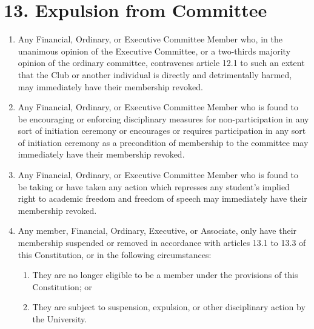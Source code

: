 \documentclass[12pt]{article}
\begin{document}
\section{13. Expulsion from Committee}
\begin{enumerate}[label=13.\arabic*]
\item Any Financial, Ordinary, or Executive Committee Member who, in the unanimous opinion of the Executive Committee, or a two-thirds majority opinion of the ordinary committee, contravenes article 12.1 to such an extent that the Club or another individual is directly and detrimentally harmed, may immediately have their membership revoked.
\item Any Financial, Ordinary, or Executive Committee Member who is found to be encouraging or enforcing disciplinary measures for non-participation in any sort of initiation ceremony or encourages or requires participation in any sort of initiation ceremony as a precondition of membership to the committee may immediately have their membership revoked.
\item Any Financial, Ordinary, or Executive Committee Member who is found to be taking or have taken any action which represses any student's implied right to academic freedom and freedom of speech may immediately have their membership revoked.
\item Any member, Financial, Ordinary, Executive, or Associate, only have their membership suspended or removed in accordance with articles 13.1 to 13.3 of this Constitution, or in the following circumstances:
    \begin{enumerate}[label=\theenumi.\arabic*]
        \item They are no longer eligible to be a member under the provisions of this Constitution; or
        \item They are subject to suspension, expulsion, or other disciplinary action by the University.
    \end{enumerate}
\end{enumerate}
\end{document}
